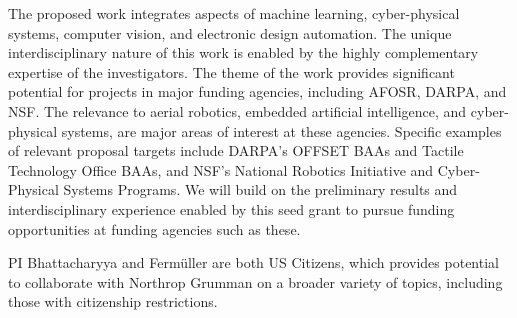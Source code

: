 The proposed work integrates aspects of machine learning, cyber-physical
systems, computer vision, and electronic design automation. The unique
interdisciplinary nature of this work is enabled by the highly complementary
expertise of the investigators. The  theme of the work
provides significant potential for projects in major funding
agencies, including AFOSR, DARPA, and NSF. The relevance to aerial robotics,
embedded artificial intelligence, and cyber-physical systems, are major areas of interest at these agencies.
Specific examples of relevant proposal targets include DARPA's OFFSET BAAs and  Tactile Technology Office BAAs, and NSF's National Robotics Initiative and 
Cyber-Physical Systems Programs.
We will build on the preliminary results and
interdisciplinary experience enabled by this seed grant to pursue funding
opportunities at funding agencies such as these. 

PI Bhattacharyya and Ferm\"{u}ller are both US Citizens, which provides
potential to collaborate with Northrop Grumman on a broader
variety of topics, including those with citizenship restrictions.

